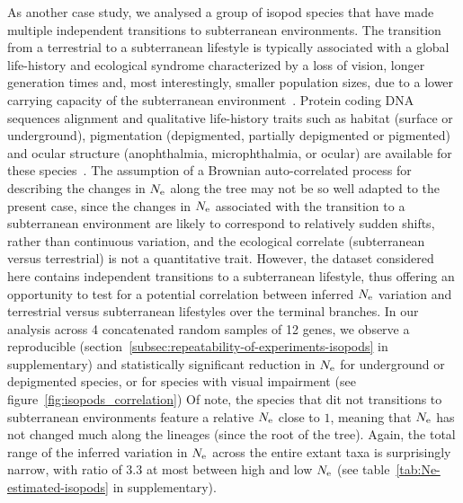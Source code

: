 As another case study, we analysed a group of isopod species that have made multiple independent transitions to subterranean environments.
The transition from a terrestrial to a subterranean lifestyle is typically associated with a global life-history and ecological syndrome characterized by a loss of vision, longer generation times and, most interestingly, smaller population sizes, due to a lower carrying capacity of the subterranean environment~\citep{Capderrey2013}.
Protein coding \acrshort{DNA} sequences alignment and qualitative life-history traits such as habitat (surface or underground), pigmentation (depigmented, partially depigmented or pigmented) and ocular structure (anophthalmia, microphthalmia, or ocular) are available for these species~\citep{Eme2013,Saclier2018}.
The assumption of a Brownian auto-correlated process for describing the changes in $N_{\text{e}}$ along the tree may not be so well adapted to the present case, since the changes in $N_{\text{e}}$ associated with the transition to a subterranean environment are likely to correspond to relatively sudden shifts, rather than continuous variation, and the ecological correlate (subterranean versus terrestrial) is not a quantitative trait.
However, the dataset considered here contains independent transitions to a subterranean lifestyle, thus offering an opportunity to test for a potential correlation between inferred $N_{\text{e}}$ variation and terrestrial versus subterranean lifestyles over the terminal branches.
In our analysis across 4 concatenated random samples of 12 genes, we observe a reproducible (section~\ref{subsec:repeatability-of-experiments-isopods} in supplementary) and statistically significant reduction in $N_{\text{e}}$ for underground or depigmented species, or for species with visual impairment (see figure~\ref{fig:isopods_correlation})
Of note, the species that dit not transitions to subterranean environments feature a relative $N_{\text{e}}$ close to $1$, meaning that $N_{\text{e}}$ has not changed much along the lineages (since the root of the tree).
Again, the total range of the inferred variation in $N_{\text{e}}$ across the entire extant taxa is surprisingly narrow, with ratio of $3.3$ at most between high and low $N_{\text{e}}$ (see table~\ref{tab:Ne-estimated-isopods} in supplementary).


